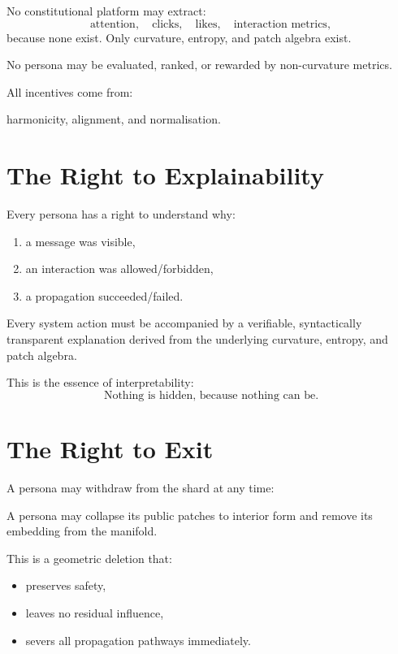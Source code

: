 No constitutional platform may extract:
\[
\text{attention}, \quad \text{clicks}, \quad \text{likes}, \quad
\text{interaction metrics},
\]
because none exist.
Only curvature, entropy, and patch algebra exist.

\begin{invariant}
No persona may be evaluated,
ranked,
or rewarded
by non-curvature metrics.
\end{invariant}

All incentives come from:
\begin{center}
harmonicity, alignment, and normalisation.
\end{center}

\section{The Right to Explainability}

Every persona has a right to understand why:

\begin{enumerate}
    \item a message was visible,
    \item an interaction was allowed/forbidden,
    \item a propagation succeeded/failed.
\end{enumerate}

\begin{invariant}[Explainability]
Every system action must be accompanied by a verifiable,
syntactically transparent explanation derived from the underlying
curvature, entropy, and patch algebra.
\end{invariant}

This is the essence of interpretability:
\[
\text{Nothing is hidden, because nothing can be.}
\]

\section{The Right to Exit}

A persona may withdraw from the shard at any time:

\begin{invariant}
A persona may collapse its public patches to interior form  
and remove its embedding from the manifold.
\end{invariant}

This is a geometric deletion that:
\begin{itemize}
    \item preserves safety,
    \item leaves no residual influence,
    \item severs all propagation pathways immediately.
\end{itemize}

